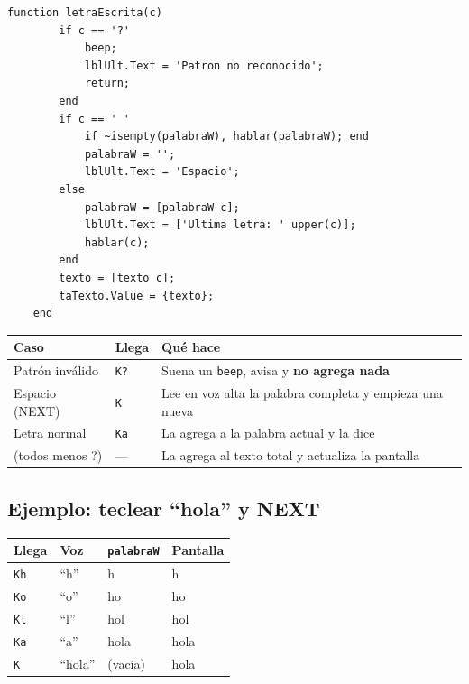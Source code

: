 \documentclass[11pt,a4paper]{article}
\newcommand{\cod}[1]{\texttt{#1}}
\begin{document}
\begin{lstlisting}[firstnumber=354]
    function letraEscrita(c)
        if c == '?'
            beep;
            lblUlt.Text = 'Patron no reconocido';
            return;
        end
        if c == ' '
            if ~isempty(palabraW), hablar(palabraW); end
            palabraW = '';
            lblUlt.Text = 'Espacio';
        else
            palabraW = [palabraW c];
            lblUlt.Text = ['Ultima letra: ' upper(c)];
            hablar(c);
        end
        texto = [texto c];
        taTexto.Value = {texto};
    end
\end{lstlisting}

\begin{center}
\begin{tabular}{l l >{\raggedright\arraybackslash}p{9.5cm}}
\toprule
\textbf{Caso} & \textbf{Llega} & \textbf{Qué hace} \\
\midrule
Patrón inválido & \cod{K?} & Suena un \cod{beep}, avisa y \textbf{no agrega nada} \\
Espacio (NEXT) & \cod{K\textvisiblespace} & Lee en voz alta la palabra completa y empieza una nueva \\
Letra normal & \cod{Ka} & La agrega a la palabra actual y la dice \\
(todos menos ?) & --- & La agrega al texto total y actualiza la pantalla \\
\bottomrule
\end{tabular}
\end{center}

\subsection*{Ejemplo: teclear ``hola'' y NEXT}
\begin{center}
\begin{tabular}{l l l l}
\toprule
\textbf{Llega} & \textbf{Voz} & \textbf{\cod{palabraW}} & \textbf{Pantalla} \\
\midrule
\cod{Kh} & ``h'' & h & h \\
\cod{Ko} & ``o'' & ho & ho \\
\cod{Kl} & ``l'' & hol & hol \\
\cod{Ka} & ``a'' & hola & hola \\
\cod{K\textvisiblespace} & ``hola'' & (vacía) & hola\textvisiblespace \\
\bottomrule
\end{tabular}
\end{center}
\end{document}
